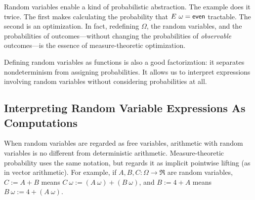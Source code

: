 Random variables enable a kind of probabilistic abstraction. The example does it twice. The first makes calculating the probability that $E~\omega = \mathsf{even}$ tractable. The second is an optimization. In fact, redefining $\Omega$, the random variables, and the probabilities of outcomes---without changing the probabilities of \textit{observable} outcomes---is the essence of measure-theoretic optimization.

Defining random variables as functions is also a good factorization: it separates nondeterminism from assigning probabilities. It allows us to interpret expressions involving random variables without considering probabilities at all.

\subsection{Interpreting Random Variable Expressions As Computations}

When random variables are regarded as free variables, arithmetic with random variables is no different from deterministic arithmetic. Measure-theoretic probability uses the same notation, but regards it as implicit pointwise lifting (as in vector arithmetic). For example, if $A,B,C : \Omega \to \Re$ are random variables, $C := A + B$ means $C~\omega := (A~\omega) + (B~\omega)$, and
$B := 4 + A$ means $B~\omega := 4 + (A~\omega)$.

